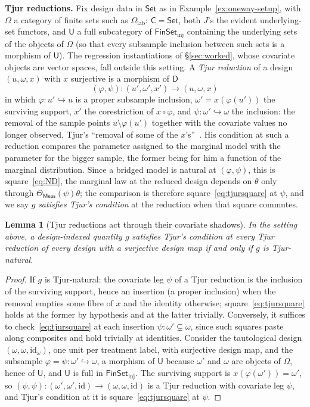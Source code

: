 \documentclass[11pt,a4paper]{article}
\theoremstyle{plain}
\newtheorem{lemma}[theorem]{Lemma}
\theoremstyle{definition}
\theoremstyle{remark}
\newcommand{\cat}[1]{\mathsf{#1}}
\newcommand{\catU}{\cat{U}}
\newcommand{\catO}{\cat{\Omega}}
\newcommand{\catD}{\cat{D}}
\newcommand{\Meas}{\cat{Meas}}
\newcommand{\Set}{\cat{Set}}
\newcommand{\FinSet}{\cat{FinSet}}
\newcommand{\id}{\mathrm{id}}
\begin{document}
\medskip
\noindent\textbf{Tjur reductions.} Fix design data in $\Set$ as in
Example~\ref{ex:oneway-setup}, with $\catO$ a category of finite sets such as
$\catO_{\mathrm{lab}}$: $\cat{C} = \Set$, both $J$'s the evident
underlying-set functors, and
$\catU$ a full subcategory of $\FinSet_{\mathrm{inj}}$ containing the
underlying sets of the objects of $\catO$ (so that every subsample inclusion
between such sets is a morphism of $\catU$). The regression instantiations
of \S\ref{sec:worked}, whose covariate objects are vector spaces, fall
outside this setting. A \emph{Tjur reduction} of a design
$(u,\omega,x)$ with $x$ surjective is a morphism of $\catD$
\[
(\varphi,\psi) \colon (u',\omega',x') \longrightarrow (u,\omega,x)
\]
in which $\varphi \colon u' \hookrightarrow u$ is a proper subsample
inclusion, $\omega' = x(\varphi(u'))$ the surviving support, $x'$ the
corestriction of $x \circ \varphi$, and
$\psi \colon \omega' \hookrightarrow \omega$ the inclusion: the removal of
the sample points $u \setminus \varphi(u')$ together with the covariate
values no longer observed, Tjur's ``removal of some of the
$x$'s''~\cite[p.~1299]{tjur_discussion_2002}. His condition at such a
reduction compares the parameter assigned to the marginal model with the
parameter for the bigger sample, the former being for him a function of the
marginal distribution. Since a bridged model is natural at $(\varphi,\psi)$,
this is square~\eqref{eq:ND}, the marginal law at the reduced design
depends on $\theta$ only through $\Theta_\Meas(\psi)\theta$; the comparison
is therefore square~\eqref{eq:tjursquare} at $\psi$, and we say $g$
\emph{satisfies Tjur's condition} at the reduction when that square
commutes.

\begin{lemma}[Tjur reductions act through their covariate
shadows]\label{lem:tjurshadow}
In the setting above, a design-indexed quantity $g$ satisfies Tjur's
condition at every Tjur reduction of every design with a surjective design map
if and only if $g$ is Tjur-natural.
\end{lemma}

\begin{proof}
If $g$ is Tjur-natural: the covariate leg $\psi$ of a Tjur reduction is the
inclusion of the surviving support, hence an insertion (a proper inclusion)
when the removal empties some fibre of $x$ and the identity otherwise;
square~\eqref{eq:tjursquare} holds at the former by hypothesis and at the
latter trivially. Conversely, it suffices to check~\eqref{eq:tjursquare} at
each insertion $\psi \colon \omega' \subsetneq \omega$, since such squares
paste along composites and hold trivially at identities. Consider the
tautological design $(\omega,\omega,\id_\omega)$, one unit per treatment
label, with surjective design map, and the subsample
$\varphi = \psi \colon \omega' \hookrightarrow \omega$, a morphism of $\catU$
because $\omega'$ and $\omega$ are objects of $\catO$, hence of $\catU$, and
$\catU$ is full in $\FinSet_{\mathrm{inj}}$. The surviving support is
$x(\varphi(\omega')) = \omega'$, so
$(\psi,\psi) \colon (\omega',\omega',\id) \to (\omega,\omega,\id)$ is a Tjur
reduction with covariate leg $\psi$, and Tjur's condition at it is
square~\eqref{eq:tjursquare} at $\psi$.
\end{proof}
\end{document}
